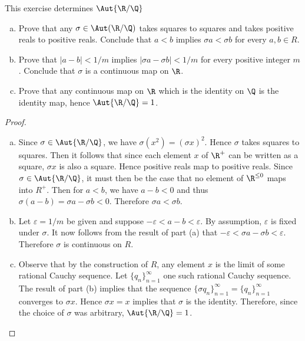 \documentclass[10pt]{amsart}
\begin{document}
\begin{6}
  \label{Ex6}
  This exercise determines $\Aut{\R/\Q}$
  \begin{enumerate}[(a)]
    \item
      Prove that any $\sigma \in \Aut(\R/\Q)$ takes squares to squares and takes positive reals to positive reals.
      Conclude that $a < b$ implies $\sigma a < \sigma b$ for every $a,b \in R$.
    \item
      Prove that $|a - b| < 1/m$ implies $|\sigma a - \sigma b|< 1/m$ for every positive integer $m$. 
      Conclude that $\sigma$ is a continuous map on $\R$.
    \item
      Prove that any continuous map on $\R$ which is the identity on $\Q$ is the identity map, hence $\Aut{\R/\Q} = 1$.
  \end{enumerate}

  \begin{proof}
    \begin{enumerate}[(a)]
    \item
      Since $\sigma \in \Aut{\R/\Q}$, we have $\sigma(x^2) = (\sigma x)^2$.
      Hence $\sigma$ takes squares to squares.
      Then it follows that since each element $x$ of $\R^+$ can be written as a square, $\sigma x$ is also a square.
      Hence positive reals map to positive reals.
      Since $\sigma \in \Aut{\R/\Q}$, it must then be the case that no element of $\R^{\leq 0}$ maps into $R^+$. 
      Then for $a < b$, we have $a - b < 0$ and thus $\sigma (a - b) = \sigma a - \sigma b < 0$.
      Therefore $\sigma a < \sigma b$.
    \item
      Let $\varepsilon = 1/m$ be given and suppose $-\varepsilon < a-b < \varepsilon$.
      By assumption, $\varepsilon$ is fixed under $\sigma$.
      It now follows from the result of part (a) that $-\varepsilon < \sigma a - \sigma b < \varepsilon$.
      Therefore $\sigma$ is continuous on $R$.
    \item
      Observe that by the construction of $R$, any element $x$ is the limit of some rational Cauchy sequence.
      Let $\{q_n\}_{n=1}^{\infty}$ one such rational Cauchy sequence.
      The result of part (b) implies that the sequence $\{\sigma q_n\}_{n=1}^{\infty} = \{q_n\}_{n=1}^{\infty}$ converges to $\sigma x$.
      Hence $\sigma x = x$ implies that $\sigma$ is the identity.
      Therefore, since the choice of $\sigma$ was arbitrary, $\Aut{\R/\Q} = 1$.
    \end{enumerate}
  \end{proof}
\end{6}
\end{document}
